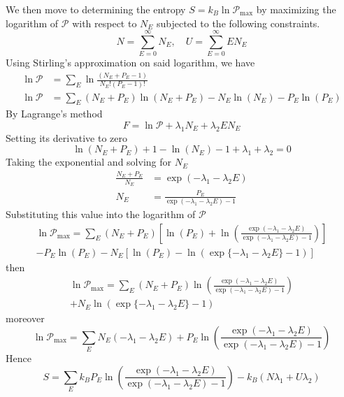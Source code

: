 \documentclass[../../../Main.tex]{subfiles}
\begin{document}
We then move to determining the entropy $S=k_B \ln \mathcal{P}_{\max}$ by maximizing the logarithm of $\mathcal{P}$ with respect to $N_E$ subjected to the following constraints.
\begin{equation*}
    N=\sum_{E=0}^{\infty}N_E,\quad U=\sum_{E=0}^{\infty}EN_E
\end{equation*}
Using Stirling's approximation on said logarithm, we have 
\begin{align*}
    \ln \mathcal{P}&=\sum_{E}\ln\frac{(N_E+P_E-1)}{N_E! (P_E-1)!}\\
    \ln \mathcal{P}&=\sum_E (N_E+P_E)\ln (N_E+P_E)-N_E\ln(N_E)- P_E \ln (P_E)
\end{align*}
By Lagrange's method
\begin{equation*}
    F=\ln \mathcal{P} +\lambda_1N_E +\lambda_2EN_E
\end{equation*}
Setting its derivative to zero
\begin{equation*}
    \ln (N_E+P_E)+1-\ln (N_E)-1+\lambda_1+\lambda_2=0
\end{equation*}
Taking the exponential and solving for $N_E$
\begin{align*}
    \frac{N_E+P_E}{N_E}&=\exp(-\lambda_1-\lambda_2E)\\
    N_E&=\frac{P_E}{\exp(-\lambda_1-\lambda_2E)-1}
\end{align*}
Substituting this value into the logarithm of $\mathcal{P}$
\begin{multline*}
    \ln \mathcal{P}_{\max}=\sum_E (N_E+P_E)\left[\ln (P_E)+\ln\left(\frac{\exp(-\lambda_1-\lambda_2E)}{\exp(-\lambda_1-\lambda_2E)-1}\right)\right]\\
    - P_E \ln (P_E)-N_E\left[\ln(P_E)-\ln\left(\exp \{-\lambda_1-\lambda_2E\}-1\right)\right] 
\end{multline*}
then 
\begin{multline*}
    \ln \mathcal{P}_{\max}=\sum_E (N_E+P_E)\ln\left(\frac{\exp(-\lambda_1-\lambda_2E)}{\exp(-\lambda_1-\lambda_2E)-1}\right)\\
    + N_E\ln\left(\exp \{-\lambda_1-\lambda_2E\}-1\right)
\end{multline*}
moreover
\begin{equation*}
    \ln \mathcal{P}_{\max}=\sum_E N_E \left(-\lambda_1-\lambda_2E\right)
    + P_E\ln\left(\frac{\exp(-\lambda_1-\lambda_2E)}{\exp(-\lambda_1-\lambda_2E)-1}\right)
\end{equation*}
Hence
\begin{equation*}
    S=\sum_E k_B P_E\ln\left(\frac{\exp(-\lambda_1-\lambda_2E)}{\exp(-\lambda_1-\lambda_2E)-1}\right)-k_B(N\lambda_1+U\lambda_2)
\end{equation*}
\end{document}
